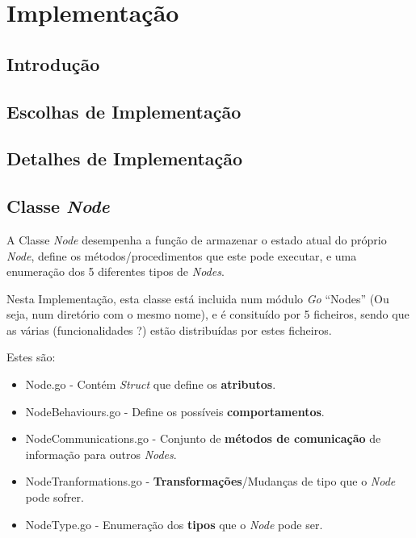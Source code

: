 \chapter{Implementação}
\label{chap:imp}

\section{Introdução}
\label{chap4:sec:intro}


\section{Escolhas de Implementação}
\label{chap4:escolhas_implementacao}

\section{Detalhes de Implementação}

\section{Classe \emph{Node}}
A Classe \emph{Node} desempenha a função de armazenar o estado atual do próprio \emph{Node}, define os métodos/procedimentos que este pode executar, e uma enumeração dos 5 diferentes tipos de \emph{Nodes}.

Nesta Implementação, esta classe está incluida num módulo \emph{Go} ``Nodes'' (Ou seja, num diretório com o mesmo nome), e é consituído por 5 ficheiros, sendo que as várias (funcionalidades ?) estão distribuídas por estes ficheiros.

Estes são:
\begin{itemize}
    \item Node.go - Contém \emph{Struct} que define os \textbf{atributos}.
    \item NodeBehaviours.go - Define os possíveis \textbf{comportamentos}.
    \item NodeCommunications.go - Conjunto de \textbf{métodos de comunicação} de informação para outros \emph{Nodes}.
    \item NodeTranformations.go - \textbf{Transformações}/Mudanças de tipo que o \emph{Node} pode sofrer.
    \item NodeType.go - Enumeração dos \textbf{tipos} que o \emph{Node} pode ser.
\end{itemize} 


